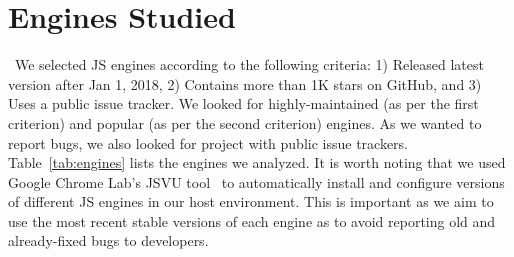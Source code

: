 \documentclass[smallextended]{svjour3}
\begin{document}





\section{Engines Studied}
\label{sec:methodology}
\label{sec:methodology:engines}~We selected
JS engines according to the following criteria: 1) Released latest
version after Jan 1, 2018, 2) Contains more than 1K stars on GitHub,
and 3) Uses a public issue tracker. We looked for highly-maintained
(as per the first criterion) and popular (as per the second criterion)
engines. As we wanted to report bugs, we also looked for project with
public issue trackers. Table~\ref{tab:engines} lists the engines we
analyzed. It is worth noting that we used Google Chrome Lab's JSVU
tool~\cite{jsvu} to automatically install and configure versions of
different JS engines in our host environment. This is important as we
aim to use the most recent stable versions of each engine as to avoid
reporting old and already-fixed bugs to developers.

\end{document}
